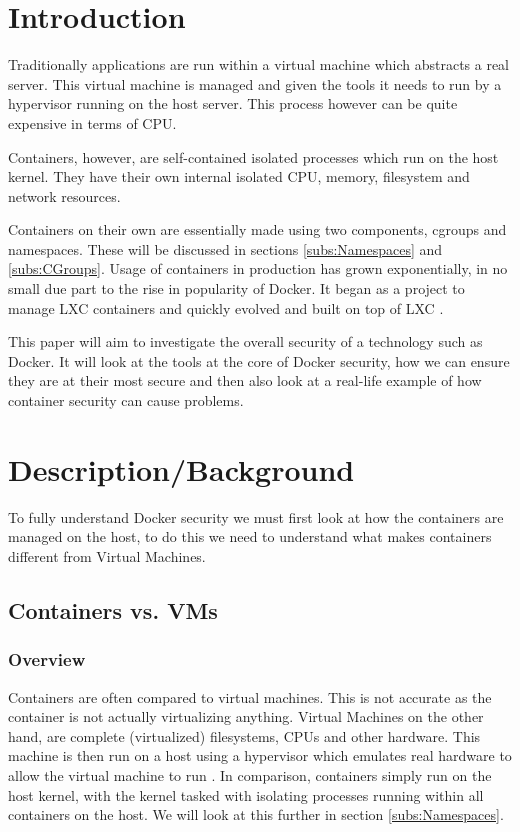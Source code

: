 \documentclass{article}
\author{Stephen Coady}
\begin{document}

\thispagestyle{empty}

\newpage
\tableofcontents
\newpage

\newpage
\section{Introduction}
\label{sec:Introduction} %
Traditionally applications are run within a virtual machine which abstracts a real server. This virtual machine is managed and given the tools it needs to run by a hypervisor running on the host server. This process however can be quite expensive in terms of CPU.

Containers, however, are self-contained isolated processes which run on the host kernel. They have their own internal isolated CPU, memory, filesystem and network resources. 

Containers on their own are essentially made using two components, cgroups and namespaces. These will be discussed in sections \ref{subs:Namespaces} and \ref{subs:CGroups}. Usage of containers in production has grown exponentially, in no small due part to the rise in popularity of Docker. It began as a project to manage LXC containers and quickly evolved and built on top of LXC \citep{BCN}.

This paper will aim to investigate the overall security of a technology such as Docker. It will look at the tools at the core of Docker security, how we can ensure they are at their most secure and then also look at a real-life example of how container security can cause problems.

\newpage
\section{Description/Background}
\label{sec:Description/Background}
To fully understand Docker security we must first look at how the containers are managed on the host, to do this we need to understand what makes containers different from Virtual Machines.

\subsection{Containers vs. VMs}
\label{subs:VMs}
\subsubsection{Overview}
Containers are often compared to virtual machines. This is not accurate as the container is not actually virtualizing anything. Virtual Machines on the other hand, are complete (virtualized) filesystems, CPUs and other hardware. This machine is then run on a host using a hypervisor which emulates real hardware to allow the virtual machine to run \citep{Hertz2016}. In comparison, containers simply run on the host kernel, with the kernel tasked with isolating processes running within all containers on the host. We will look at this further in section \ref{subs:Namespaces}.
\end{document}
